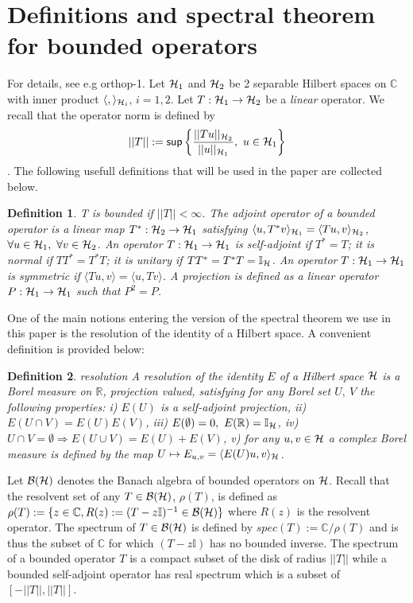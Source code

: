 \documentclass[10pt]{book}
\renewcommand{\sup}{\mathsf{sup}}
\theoremstyle{break}
\newtheorem{definition}{Definition}
\begin{document}
\section{Definitions and spectral theorem for bounded operators}

For details, see e.g {orthop-1}. Let ${\cal{H}}_1$ and ${\cal{H}}_2$ be 2 separable Hilbert spaces on $\mathbb{C}$ with inner product $\langle, \rangle_{{\cal{H}}_i}$, $i=1,2$. Let $T:{\cal{H}}_1\to{\cal{H}}_2$ be a {\it{linear}} operator. We recall that the operator norm is defined by $$||T||:=\sup\left\{\frac{||Tu||_{{\cal{H}}_2}}{||u||_{{\cal{H}}_1}},\ u\in{\cal{H}}_1 \right\}$$. The following usefull definitions that will be used in the paper are collected below.

\begin{definition}
T is bounded if $||T||<\infty$. The adjoint operator of a bounded operator is a linear map $T^*:{\cal{H}}_2\to{\cal{H}}_1$ satisfying $\langle u, T^*v\rangle_{{\cal{H}}_1}=\langle Tu,v \rangle_{{\cal{H}}_2}$, $\forall u\in{\cal{H}}_1,\ \forall v\in{\cal{H}}_2$. An operator $T:{\cal{H}}_1\to{\cal{H}}_1$ is 
self-adjoint if $T^*=T$; it is normal if $TT^*=T^*T$; it is unitary if $TT^*=T^*T=\mathbb{I}_{\cal{H}}$. An operator $T:{\cal{H}}_1\to{\cal{H}}_1$ is symmetric if $\langle Tu,v \rangle=\langle u,Tv\rangle$. A projection is defined as a linear operator $P:{\cal{H}}_1\to{\cal{H}}_1$ such that $P^2=P$.
\end{definition}

One of the main notions entering the version of the spectral theorem we use in this paper is the resolution of the identity of a Hilbert space. A convenient definition is provided below:
\begin{definition}{resolution}
A resolution of the identity $E$ of a Hilbert space ${\cal{H}}$ is a Borel measure on $\mathbb{R}$, projection valued, satisfying for any Borel set $U,\ V$ the following properties: i) $E(U)$ is a self-adjoint projection, ii) $E(U\cap V)=E(U)E(V)$, iii) $E(\emptyset)=0,\ E(\mathbb{R})=\mathbb{I}_{{\cal{H}}}$, iv) $U\cap V=\emptyset\Rightarrow E(U\cup V)=E(U)+E(V)$, v) for any $u,v\in\cal{H}$ a complex Borel measure is defined by the map $U\mapsto E_{u,v}=\langle E(U)u,v \rangle_{\cal{H}}$.
\end{definition}
Let ${\cal{B}}({\cal{H}})$ denotes the Banach algebra of bounded operators on ${\cal{H}}$. Recall that the resolvent set of any $T\in{\cal{B}}({\cal{H}})$, $\rho(T)$, is defined as $\rho(T):=\{z\in\mathbb{C}, R(z):=(T-z\mathbb{I})^{-1}\in{\cal{B}}({\cal{H}})  \}$ where $R(z)$ is the resolvent operator. The spectrum of $T\in{\cal{B}}({\cal{H}})$ is defined by $spec(T):=\mathbb{C}/\rho(T)$ and is thus the subset of $\mathbb{C}$ for which $(T-z\mathbb{I})$ has no bounded inverse. The spectrum of a bounded operator $T$ is a compact subset of the disk of radius $||T||$ while a bounded self-adjoint operator has real spectrum which is a subset of 
$[-||T||,||T||]$.\par
\end{document}
